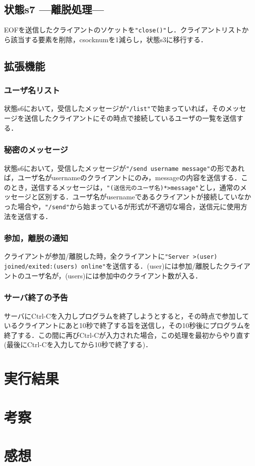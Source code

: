 \documentclass[a4j,10pt,titlepage]{jsarticle}
\begin{document}
\subsection{状態s7 ---離脱処理---}
EOFを送信したクライアントのソケットを\verb|"close()"|し．クライアントリストから該当する要素を削除，csocknumを1減らし，状態s3に移行する．

\subsection{拡張機能}\label{sec:extsrv}
\subsubsection{ユーザ名リスト}
状態s6において，受信したメッセージが\verb|"/list"|で始まっていれば，そのメッセージを送信したクライアントにその時点で接続しているユーザの一覧を送信する．

\subsubsection{秘密のメッセージ}
状態s6において，受信したメッセージが\verb|"/send username message"|の形であれば，ユーザ名がusernameのクライアントにのみ，messageの内容を送信する．このとき，送信するメッセージは，\verb|"(送信元のユーザ名)*>message"|とし，通常のメッセージと区別する．ユーザ名がusernameであるクライアントが接続していなかった場合や，\verb|"/send"|から始まっているが形式が不適切な場合，送信元に使用方法を送信する．

\subsubsection{参加，離脱の通知}
クライアントが参加/離脱した時，全クライアントに\verb|"Server >(user) joined/exited:(users) online"|を送信する．(user)には参加/離脱したクライアントのユーザ名が，(users)には参加中のクライアント数が入る．

\subsubsection{サーバ終了の予告}
サーバにCtrl-Cを入力しプログラムを終了しようとすると，その時点で参加しているクライアントにあと10秒で終了する旨を送信し，その10秒後にプログラムを終了する．この間に再びCtrl-Cが入力された場合，この処理を最初からやり直す(最後にCtrl-Cを入力してから10秒で終了する)．

\section{実行結果}

\section{考察}

\section{感想}
\end{document}
